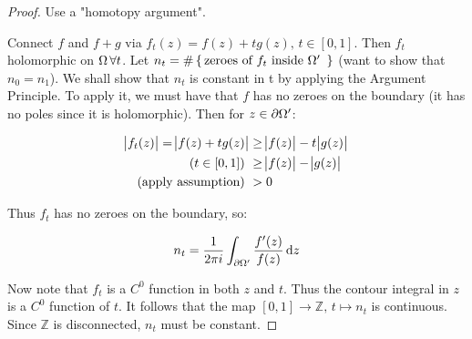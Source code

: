 \begin{proof} Use a "homotopy argument".

Connect $f$ and $f+g$ via $f_t(z) = f(z) + tg(z), \, t \in [0,1]$. Then $f_t$ holomorphic on $\Omega \, \forall t$. Let $n_t = \# \set{ \text{zeroes of $f_t$ inside $\Omega '$  }}$ (want to show that $n_0 = n_1$). We shall show that $n_t$ is constant in t by applying the Argument Principle. To apply it, we must have that $f $ has no zeroes on the boundary (it has no poles since it is holomorphic). Then for $z \in \partial \Omega '$:

\begin{align*}
    \abs{f_t(z)} = \abs{f(z) + tg(z)} &\geq \abs{f(z)} - t\abs{g(z)}\\
    \text{($t\in [0,1] $) }&\geq \abs{f(z)} - \abs{g(z)}\\
    \text{(apply assumption) }&> 0
\end{align*}

Thus $f_t$ has no zeroes on the boundary, so:

\begin{align*}
    n_t = \frac{1}{2 \pi i} \int_{\partial \om '} \frac{f'(z)}{f(z)} \dif z
\end{align*}

Now note that $f_t$ is a $C^0$ function in both $z$ and $t$. Thus the contour integral in $z$ is a $C^0 $ function of $t$. It follows that the map $[0,1] \to \mathbb{Z}, \, t \mapsto n_t$ is continuous. Since $\mathbb{Z}$ is disconnected, $n_t$ must be constant.


\end{proof}












































